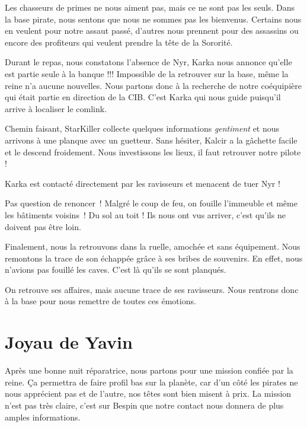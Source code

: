 \documentclass[a4paper,9pt,twoside,twocolumn,openany]{book}
\begin{document}
Les chasseurs de primes ne nous aiment pas, mais ce ne sont pas les seuls. Dans la base pirate, nous sentons que nous ne sommes pas les bienvenus. Certains nous en veulent pour notre assaut passé, d'autres nous prennent pour des assassins ou encore des profiteurs qui veulent prendre la tête de la Sororité.

Durant le repas, nous constatons l'absence de Nyr, Karka nous annonce qu'elle est partie seule à la banque !!! Impossible de la retrouver sur la base, même la reine n'a aucune nouvelles.
Nous partons donc à la recherche de notre coéquipière qui était partie en direction de la CIB. C'est Karka qui nous guide puisqu'il arrive à localiser le comlink.

Chemin faisant, StarKiller collecte quelques informations \emph{gentiment} et nous arrivons à une planque avec un guetteur. Sans hésiter, Kalcir a la gâchette facile et le descend froidement. Nous investissons les lieux, il faut retrouver notre pilote !

Karka est contacté directement par les ravisseurs et menacent de tuer Nyr !

Pas question de renoncer\ ! Malgré le coup de feu, on fouille l'immeuble et même les bâtiments voisins\ ! Du sol au toit ! Ils nous ont vus arriver, c'est qu'ils ne doivent pas être loin.

Finalement, nous la retrouvons dans la ruelle, amochée et sans équipement. Nous remontons la trace de son échappée grâce à ses bribes de souvenirs. En effet, nous n'avions pas fouillé les caves. C'est là qu'ils se sont planqués.

On retrouve ses affaires, mais aucune trace de ses ravisseurs. Nous rentrons donc à la base pour nous remettre de toutes ces émotions.

\chapter{Joyau de Yavin}

Après une bonne nuit réparatrice, nous partons pour une mission confiée par la reine. Ça permettra de faire profil bas sur la planète, car d'un côté les pirates ne nous apprécient pas et de l'autre, nos têtes sont bien misent à prix. La mission n'est pas très claire, c'est sur Bespin que notre contact nous donnera de plus amples informations.
\end{document}

